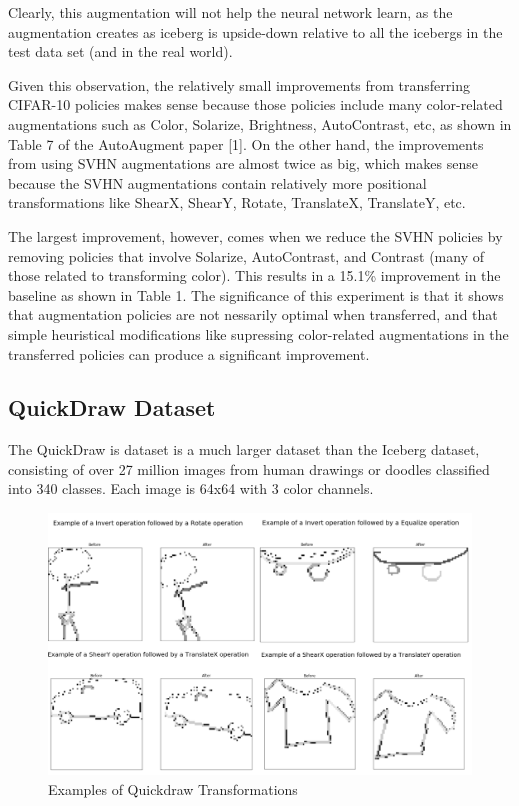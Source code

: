 \documentclass[10pt,twocolumn,letterpaper]{article}
\begin{document}
Clearly, this augmentation will not help the neural network learn, as the augmentation creates as iceberg is upside-down relative to all the icebergs in the test data set (and in the real world). 

Given this observation, the relatively small improvements from transferring CIFAR-10 policies makes sense because those policies include many color-related augmentations such as Color, Solarize, Brightness, AutoContrast, etc, as shown in Table 7 of the AutoAugment paper [1].  On the other hand, the improvements from using SVHN augmentations are almost twice as big, which makes sense because the SVHN augmentations contain relatively more positional transformations like ShearX, ShearY, Rotate, TranslateX, TranslateY, etc.

The largest improvement, however, comes when we reduce the SVHN policies by removing policies that involve Solarize, AutoContrast, and Contrast (many of those related to transforming color).  This results in a 15.1\% improvement in the baseline as shown in Table 1.  The significance of this experiment is that it shows that augmentation policies are not nessarily optimal when transferred, and that simple heuristical modifications like supressing color-related augmentations in the transferred policies can produce a significant improvement.


\subsection{QuickDraw Dataset}

The QuickDraw is dataset is a much larger dataset than the Iceberg dataset, consisting of over 27 million images from human drawings or doodles classified into 340 classes.  Each image is 64x64 with 3 color channels.  



\begin{figure}[bhp]
\includegraphics[width=\columnwidth]{quickdraw_compiled_transform_exmples.png}
\caption{Examples of Quickdraw Transformations}
\end{figure}
\end{document}
